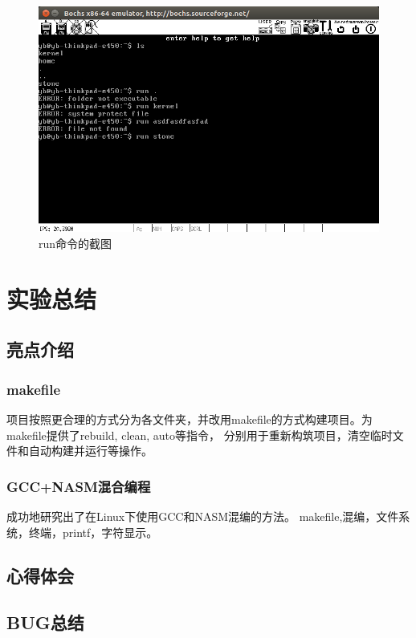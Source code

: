 \documentclass[a4paper]{article}
\begin{document}
    
    
    \begin{figure}[!htb]
        \begin{center}
        \includegraphics[scale=0.5]{asset/runfiles.png}
        \caption{run命令的截图\label{fig:runfiles}} 
        \end{center} 
    \end{figure} 
    
    
\section{实验总结}
    \subsection{亮点介绍}
    \subsubsection{makefile}
    项目按照更合理的方式分为各文件夹，并改用makefile的方式构建项目。为makefile提供了rebuild, clean, auto等指令，
    分别用于重新构筑项目，清空临时文件和自动构建并运行等操作。
    \subsubsection{GCC+NASM混合编程}
    成功地研究出了在Linux下使用GCC和NASM混编的方法。
    makefile,混编，文件系统，终端，printf，字符显示。
    \subsection{心得体会}
    \subsection{BUG总结} \label{sec:bug}
\end{document}
